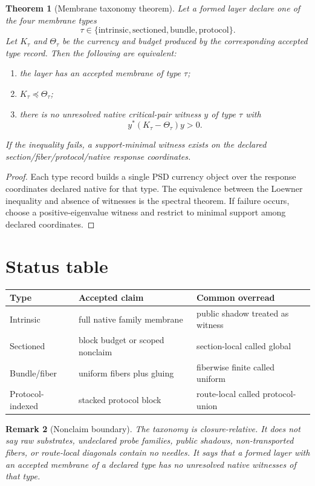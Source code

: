 \documentclass[11pt]{article}
\newtheorem{theorem}{Theorem}[section]
\newtheorem{remark}[theorem]{Remark}
\begin{document}
\begin{theorem}[Membrane taxonomy theorem]\label{thm:taxonomy}
Let a formed layer declare one of the four membrane types
\[
  \tau\in\{\mathrm{intrinsic},\mathrm{sectioned},\mathrm{bundle},\mathrm{protocol}\}.
\]
Let \(K_\tau\) and \(\Theta_\tau\) be the currency and budget produced by the corresponding accepted type record. Then the following are equivalent:
\begin{enumerate}[label=(\roman*)]
\item the layer has an accepted membrane of type \(\tau\);
\item \(K_\tau\preceq\Theta_\tau\);
\item there is no unresolved native critical-pair witness \(y\) of type \(\tau\) with
\[
   y^*(K_\tau-\Theta_\tau)y>0.
\]
\end{enumerate}
If the inequality fails, a support-minimal witness exists on the declared section/fiber/protocol/native response coordinates.
\end{theorem}
\begin{proof}
Each type record builds a single PSD currency object over the response coordinates declared native for that type. The equivalence between the Loewner inequality and absence of witnesses is the spectral theorem. If failure occurs, choose a positive-eigenvalue witness and restrict to minimal support among declared coordinates.
\end{proof}

\section{Status table}
\begin{center}
\begin{tabular}{lll}
\toprule
Type & Accepted claim & Common overread \\
\midrule
Intrinsic & full native family membrane & public shadow treated as witness \\
Sectioned & block budget or scoped nonclaim & section-local called global \\
Bundle/fiber & uniform fibers plus gluing & fiberwise finite called uniform \\
Protocol-indexed & stacked protocol block & route-local called protocol-union \\
\bottomrule
\end{tabular}
\end{center}

\begin{remark}[Nonclaim boundary]
The taxonomy is closure-relative. It does not say raw substrates, undeclared probe families, public shadows, non-transported fibers, or route-local diagonals contain no needles. It says that a formed layer with an accepted membrane of a declared type has no unresolved native witnesses of that type.
\end{remark}
\end{document}
